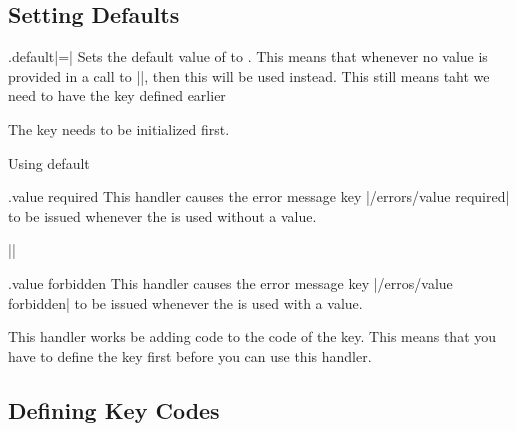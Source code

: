 \subsection{Setting Defaults}

\label{section-default-handlers}

\begin{handler}{.default}{|=|}
  Sets the default value of  to . This means
  that whenever no value is provided in a call to |\pgfkeys|, then
  this  will be used instead. This still means taht we need to have the key defined earlier
\end{handler}
The key needs to be initialized first. 

\begin{texexample}{Using default}{}
\end{texexample}


\begin{handler}{{.value required}}{}
  This handler causes the error message key |/errors/value required| to
  be issued whenever the  is used without a value.

  \example ||
\end{handler}

\begin{handler}{{.value forbidden}}{}
  This handler causes the error message key |/erros/value forbidden|
  to be issued whenever the  is used with a value.

  This handler works be adding code to the code of the key. This means
  that you have to define the key first before you can use this
  handler. 


\end{handler}
\begin{codeexample}


\end{codeexample}



\subsection{Defining Key Codes}

\label{section-code-handlers}

